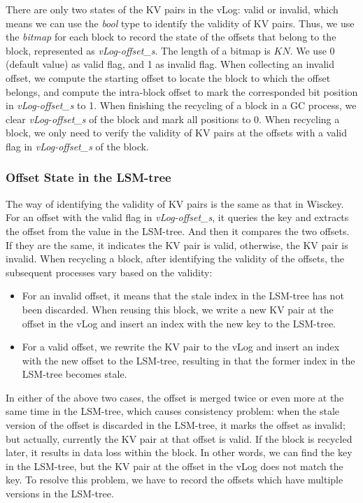 \documentclass[sigconf]{acmart}
\begin{document}
There are only two states of the KV pairs in the vLog: valid or invalid, which means we can use the \textit{bool} type to identify the validity of KV pairs. Thus, we use the \textit{bitmap} for each block to record the state of the offsets that belong to the block, represented as \textit{vLog-offset\_s}. The length of a bitmap is $KN$. We use 0 (default value) as valid flag, and 1 as invalid flag. When collecting an invalid offset, we compute the starting offset to locate the block to which the offset belongs, and compute the intra-block offset to mark the corresponded bit position in \textit{vLog-offset\_s} to 1. When finishing the recycling of a block in a GC process, we clear \textit{vLog-offset\_s} of the block and mark all positions to 0. When recycling a block, we only need to verify the validity of KV pairs at the offsets with a valid flag in \textit{vLog-offset\_s} of the block.

\subsubsection{Offset State in the LSM-tree}
The way of identifying the validity of KV pairs is the same as that in Wisckey. For an offset with the valid flag in \textit{vLog-offset\_s}, it queries the key and extracts the offset from the value in the LSM-tree. And then it compares the two offsets. If they are the same, it indicates the KV pair is valid, otherwise, the KV pair is invalid. When recycling a block, after identifying the validity of the offsets, the subsequent processes vary based on the validity:
\begin{itemize}
	\item For an invalid offset, it means that the stale index in the LSM-tree has not been discarded. When reusing this block, we write a new KV pair at the offset in the vLog and insert an index with the new key to the LSM-tree. 
	\item For a valid offset, we rewrite the KV pair to the vLog and insert an index with the new offset to the LSM-tree, resulting in that the former index in the LSM-tree becomes stale. 
\end{itemize}

In either of the above two cases, the offset is merged twice or even more at the same time in the LSM-tree, which causes consistency problem: when the stale version of the offset is discarded in the LSM-tree, it marks the offset as invalid; but actually, currently the KV pair at that offset is valid. If the block is recycled later, it results in data loss within the block. In other words, we can find the key in the LSM-tree, but the KV pair at the offset in the vLog does not match the key. To resolve this problem, we have to record the offsets which have multiple versions in the LSM-tree.
\end{document}
